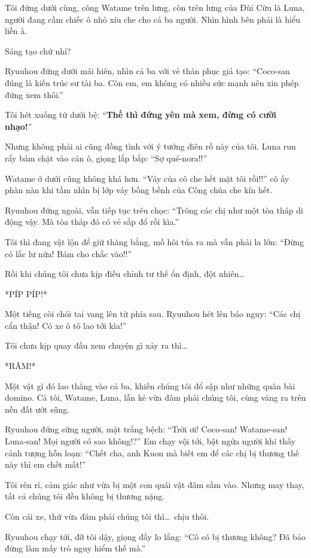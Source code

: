 \documentclass[../main.tex]{subfiles}
\begin{document}
Tôi đứng dưới cùng, cõng Watame trên lưng, còn trên lưng của Đùi Cừu là Luna, người đang cầm chiếc ô nhỏ xíu che cho cả ba người. Nhìn hình bên phải là hiểu liền à.

Sáng tạo chứ nhỉ?

Ryuuhou đứng dưới mái hiên, nhìn cả ba với vẻ thán phục giả tạo: ``Coco-san đúng là kiến trúc sư tài ba. Còn em, em không có nhiều sức mạnh nên xin phép đứng xem thôi.''

Tôi hét xuống từ dưới bệ: ``\textbf{Thế thì đứng yên mà xem, đừng có cười nhạo!}''

Nhưng không phải ai cũng đồng tình với ý tưởng điên rồ này của tôi. Luna run rẩy bám chặt vào cán ô, giọng lắp bắp: ``Sợ qué-nora!!''

Watame ở dưới cũng không khá hơn. ``Váy của cô che hết mặt tôi rồi!!'' cô ấy phàn nàn khi tầm nhìn bị lớp váy bồng bềnh của Công chúa che kín hết.

Ryuuhou đứng ngoài, vẫn tiếp tục trêu chọc: ``Trông các chị như một tòa tháp di động vậy. Mà tòa tháp đó có vẻ sắp đổ rồi kìa.''

Tôi thì đang vật lộn để giữ thăng bằng, mồ hôi túa ra mà vẫn phải la lớn: ``Đừng có lắc lư nữa! Bám cho chắc vào!!''

Rồi khi chúng tôi chưa kịp điều chỉnh tư thế ổn định, đột nhiên\dots

*PÍP PÍP!*

Một tiếng còi chói tai vang lên từ phía sau. Ryuuhou hét lên báo nguy: ``Các chị cẩn thận! Có xe ô tô lao tới kìa!''

Tôi chưa kịp quay đầu xem chuyện gì xảy ra thì\dots

*RÂM!*

Một vật gì đó lao thẳng vào cả ba, khiến chúng tôi đổ sập như những quân bài domino. Cả tôi, Watame, Luna, lẫn kẻ vừa đâm phải chúng tôi, cùng văng ra trên nền đất ướt sũng.

Ryuuhou đứng sững người, mặt trắng bệch: ``Trời ơi! Coco-san! Watame-san! Luna-san! Mọi người có sao không!?'' Em chạy vội tới, bật ngửa người khi thấy cảnh tượng hỗn loạn: ``Chết cha, anh Kuon mà biết em để các chị bị thương thế này thì em chết mất!''

Tôi rên rỉ, cảm giác như vừa bị một con quái vật đâm sầm vào. Nhưng may thay, tất cả chúng tôi đều không bị thương nặng.

Còn cái xe, thứ vừa đâm phải chúng tôi thì\dots\ chịu thôi.

Ryuuhou chạy tới, đỡ tôi dậy, giọng đầy lo lắng: ``Cô có bị thương không? Đã bảo đừng làm mấy trò nguy hiểm thế mà.''
\end{document}
